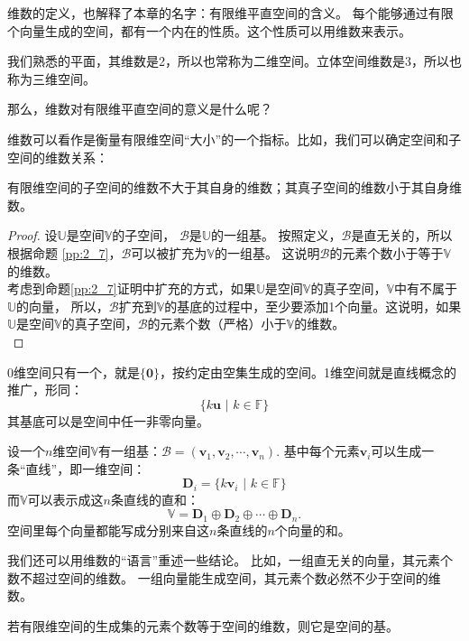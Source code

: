 \documentclass[12pt,UTF8,fontset=none]{ctexbook}
\begin{document}
维数的定义，也解释了本章的名字：有限维平直空间的含义。
每个能够通过有限个向量生成的空间，都有一个内在的性质。这个性质可以用维数来表示。

我们熟悉的平面，其维数是2，所以也常称为二维空间。立体空间维数是3，所以也称为三维空间。

那么，维数对有限维平直空间的意义是什么呢？

维数可以看作是衡量有限维空间“大小”的一个指标。比如，我们可以确定空间和子空间的维数关系：

\begin{pp}\label{pp:2_10}
    有限维空间的子空间的维数不大于其自身的维数；其真子空间的维数小于其自身维数。
\end{pp}

\begin{proof} %
    设$\mathbb{U}$是空间$\mathbb{V}$的子空间，
    $\mathcal{B}$是$\mathbb{U}$的一组基。
    按照定义，$\mathcal{B}$是直无关的，所以根据命题 \ref{pp:2_7}，$\mathcal{B}$可以被扩充为$\mathbb{V}$的一组基。 
    这说明$\mathcal{B}$的元素个数小于等于$\mathbb{V}$的维数。\\
    考虑到命题\ref{pp:2_7}证明中扩充的方式，如果$\mathbb{U}$是空间$\mathbb{V}$的真子空间，$\mathbb{V}$中有不属于$\mathbb{U}$的向量，
    所以，$\mathcal{B}$扩充到$\mathbb{V}$的基底的过程中，至少要添加1个向量。这说明，如果$\mathbb{U}$是空间$\mathbb{V}$的真子空间，$\mathcal{B}$的元素个数（严格）小于$\mathbb{V}$的维数。\\
\end{proof}


0维空间只有一个，就是$\{\mathbf{0}\}$，按约定由空集生成的空间。1维空间就是直线概念的推广，形同：
$$ \{k\mathbf{u}\,\,|\,\,k\in\mathbb{F}\}$$
其基底可以是空间中任一非零向量。

设一个$n$维空间$\mathbb{V}$有一组基：$ \mathcal{B} = (\mathbf{v}_1, \mathbf{v}_2, \cdots , \mathbf{v}_n )$.
基中每个元素$\mathbf{v}_i$可以生成一条“直线”，即一维空间：
$$ \mathbf{D}_i =  \{k\mathbf{v}_i\,\,|\,\,k\in\mathbb{F}\}$$
而$\mathbb{V}$可以表示成这$n$条直线的直和：
$$\mathbb{V} = \mathbf{D}_1 \oplus \mathbf{D}_2 \oplus \cdots \oplus \mathbf{D}_n. $$
空间里每个向量都能写成分别来自这$n$条直线的$n$个向量的和。

我们还可以用维数的“语言”重述一些结论。
比如，一组直无关的向量，其元素个数不超过空间的维数。
一组向量能生成空间，其元素个数必然不少于空间的维数。

\begin{pp}\label{pp:2_11}
    若有限维空间的生成集的元素个数等于空间的维数，则它是空间的基。
\end{pp}
\end{document}
